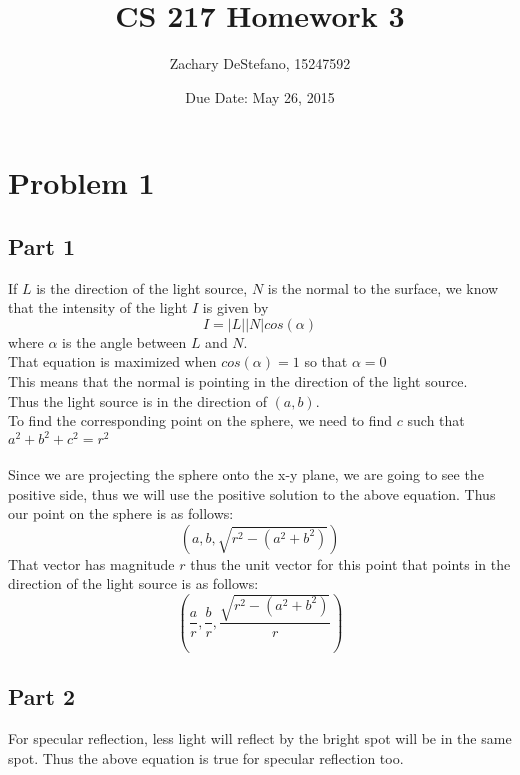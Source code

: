 \documentclass[11pt,psfig]{article}
\begin{document}
\setlength{\parskip}{1.2ex plus0.3ex minus 0.3ex}


\thispagestyle{empty} \pagestyle{myheadings} 



\title{CS 217 Homework 3}
\author{Zachary DeStefano, 15247592}
\date{Due Date: May 26, 2015}

\maketitle

\vfill\eject

\newpage

\section*{Problem 1}

\subsection{Part 1}

If $L$ is the direction of the light source, $N$ is the normal to the surface, we know that the intensity of the light $I$ is given by
\[
I = |L| |N| cos(\alpha)
\]
where $\alpha$ is the angle between $L$ and $N$.\\
That equation is maximized when $cos(\alpha)=1$ so that $\alpha=0$\\
This means that the normal is pointing in the direction of the light source. \\
Thus the light source is in the direction of $(a,b)$.\\
To find the corresponding point on the sphere, we need to find $c$ such that $a^2 + b^2 + c^2 = r^2$\\
\\
Since we are projecting the sphere onto the x-y plane, we are going to see the positive side, thus we will use the positive solution to the above equation. Thus our point on the sphere is as follows:
\[
(a,b,\sqrt{r^2-(a^2+b^2)})
\]
That vector has magnitude $r$ thus the unit vector for this point that points in the direction of the light source is as follows:
\[
(\frac{a}{r},\frac{b}{r},\frac{\sqrt{r^2-(a^2+b^2)}}{r})
\]

\subsection{Part 2}

For specular reflection, less light will reflect by the bright spot will be in the same spot. Thus the above equation is true for specular reflection too. 
\end{document}
